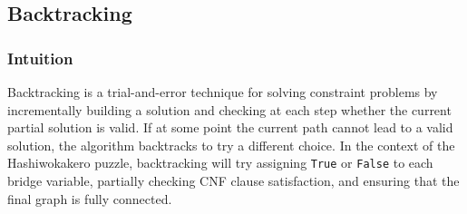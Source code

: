 \subsection{Backtracking}

\subsubsection{Intuition}
Backtracking is a trial-and-error technique for solving constraint problems by incrementally building a solution and checking at each step whether the current partial solution is valid. If at some point the current path cannot lead to a valid solution, the algorithm backtracks to try a different choice. In the context of the Hashiwokakero puzzle, backtracking will try assigning \texttt{True} or \texttt{False} to each bridge variable, partially checking CNF clause satisfaction, and ensuring that the final graph is fully connected.

